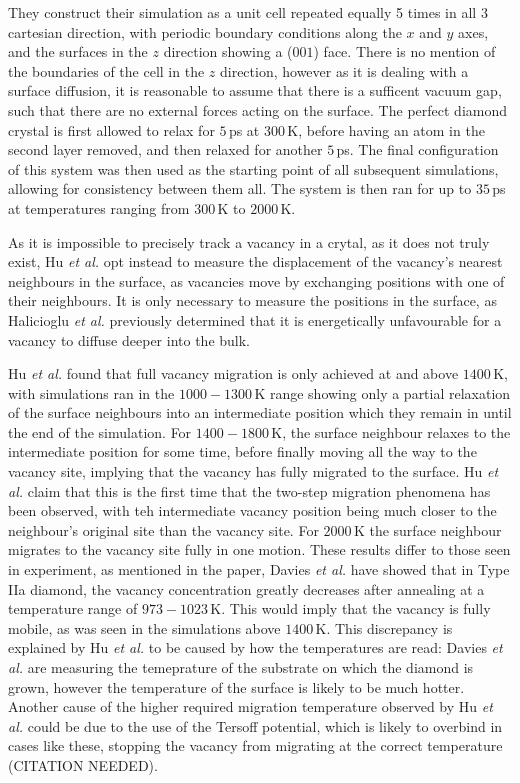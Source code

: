 \documentclass[10pt,a4paper,twocolumn,twoside]{extarticle}
\newcommand{\al}{\emph{et al. }}
\begin{document}
They construct their simulation as a unit cell repeated equally 5 times in all 3 cartesian direction, with periodic boundary conditions along the $x$ and $y$ axes, and the surfaces in the $z$ direction showing a ($001$) face. There is no mention of the boundaries of the cell in the $z$ direction, however as it is dealing with a surface diffusion, it is reasonable to assume that there is a sufficent vacuum gap, such that there are no external forces acting on the surface. The perfect diamond crystal is first allowed to relax for $5$\,ps at $300$\,K, before having an atom in the second layer removed, and then relaxed for another $5$\,ps. The final configuration of this system was then used as the starting point of all subsequent simulations, allowing for consistency between them all. The system is then ran for up to $35$\,ps at temperatures ranging from $300$\,K to $2000$\,K. 

As it is impossible to precisely track a vacancy in a crytal, as it does not truly exist, Hu \al opt instead to measure the displacement of the vacancy's nearest neighbours in the surface, as vacancies move by exchanging positions with one of their neighbours. It is only necessary to measure the positions in the surface, as Halicioglu \al\cite{Halicioglu} previously determined that it is energetically unfavourable for a vacancy to diffuse deeper into the bulk. 

Hu \al found that full vacancy migration is only achieved at and above $1400$\,K, with simulations ran in the $1000 - 1300$\,K range showing only a partial relaxation of the surface neighbours into an intermediate position which they remain in until the end of the simulation. For $1400 - 1800$\,K, the surface neighbour relaxes to the intermediate position for some time, before finally moving all the way to the vacancy site, implying that the vacancy has fully migrated to the surface. Hu \al claim that this is the first time that the two-step migration phenomena has been observed, with teh intermediate vacancy position being much closer to the neighbour's original site than the vacancy site. For $2000$\,K the surface neighbour migrates to the vacancy site fully in one motion. These results differ to those seen in experiment, as mentioned in the paper, Davies \al\cite{Davies} have showed that in Type IIa diamond, the vacancy concentration greatly decreases after annealing at a temperature range of $973 - 1023$\,K. This would imply that the vacancy is fully mobile, as was seen in the simulations above $1400$\,K. This discrepancy is explained by Hu \al to be caused by how the temperatures are read: Davies \al are measuring the temeprature of the substrate on which the diamond is grown, however the temperature of the surface is likely to be much hotter. Another cause of the higher required migration temperature observed by Hu \al could be due to the use of the Tersoff potential, which is likely to overbind in cases like these, stopping the vacancy from migrating at the correct temperature (CITATION NEEDED).

\printbibliography
\end{document}
